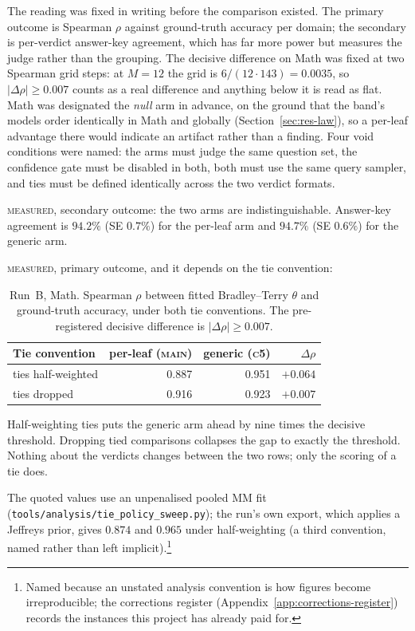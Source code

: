 The reading was fixed in writing before the comparison existed. The
primary outcome is Spearman $\rho$ against ground-truth accuracy per
domain; the secondary is per-verdict answer-key agreement, which has
far more power but measures the judge rather than the grouping. The
decisive difference on Math was fixed at two Spearman grid steps: at
$M = 12$ the grid is $6/(12 \cdot 143) = 0.0035$, so
$|\Delta\rho| \geq 0.007$ counts as a real difference and anything
below it is read as flat. Math was designated the \emph{null} arm in
advance, on the ground that the band's models order identically in Math
and globally (Section~\ref{sec:res-law}), so a per-leaf advantage there
would indicate an artifact rather than a finding. Four void conditions
were named: the arms must judge the same question set, the confidence
gate must be disabled in both, both must use the same query sampler,
and ties must be defined identically across the two verdict formats.

\textsc{measured}, secondary outcome: the two arms are
indistinguishable. Answer-key agreement is $94.2\%$ (SE $0.7\%$) for
the per-leaf arm and $94.7\%$ (SE $0.6\%$) for the generic arm.

\textsc{measured}, primary outcome, and it depends on the tie
convention:

\begin{table}[htbp]
\centering
\caption{Run~B, Math. Spearman $\rho$ between fitted Bradley--Terry
$\theta$ and ground-truth accuracy, under both tie conventions. The
pre-registered decisive difference is $|\Delta\rho| \geq 0.007$.}
\label{tab:c5-rho}
\begin{tabular}{lrrr}
\toprule
Tie convention & per-leaf (\textsc{main}) & generic (\textsc{c5}) & $\Delta\rho$ \\
\midrule
ties half-weighted & 0.887 & 0.951 & $+0.064$ \\
ties dropped       & 0.916 & 0.923 & $+0.007$ \\
\bottomrule
\end{tabular}
\end{table}

Half-weighting ties puts the generic arm ahead by nine times the
decisive threshold. Dropping tied comparisons collapses the gap to
exactly the threshold. Nothing about the verdicts changes between the
two rows; only the scoring of a tie does.

The quoted values use an unpenalised pooled MM fit
(\texttt{tools/analysis/tie\_policy\_sweep.py}); the run's own export,
which applies a Jeffreys prior, gives $0.874$ and $0.965$ under
half-weighting (a third convention, named rather than
left implicit).\footnote{Named because an unstated analysis convention
is how figures become irreproducible; the corrections register
(Appendix~\ref{app:corrections-register}) records the instances this
project has already paid for.}

